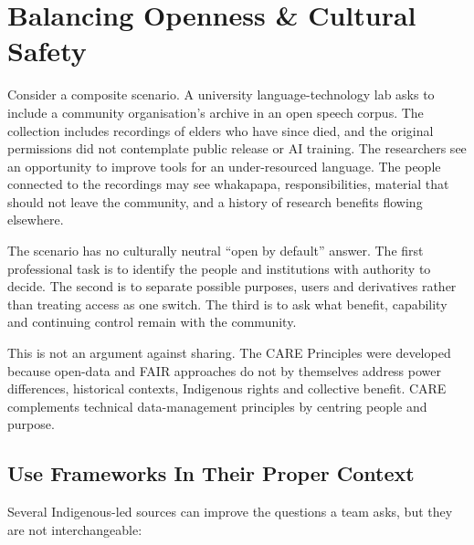 \section{Balancing Openness \& Cultural Safety}
Consider a composite scenario. A university language-technology lab asks to include a community organisation's archive in an open speech corpus. The collection includes recordings of elders who have since died, and the original permissions did not contemplate public release or AI training. The researchers see an opportunity to improve tools for an under-resourced language. The people connected to the recordings may see whakapapa, responsibilities, material that should not leave the community, and a history of research benefits flowing elsewhere.


The scenario has no culturally neutral ``open by default'' answer. The first professional task is to identify the people and institutions with authority to decide. The second is to separate possible purposes, users and derivatives rather than treating access as one switch. The third is to ask what benefit, capability and continuing control remain with the community.


This is not an argument against sharing. The CARE Principles were developed because open-data and FAIR approaches do not by themselves address power differences, historical contexts, Indigenous rights and collective benefit. CARE complements technical data-management principles by centring people and purpose. \autocite{care}



\subsection{Use Frameworks In Their Proper Context}


Several Indigenous-led sources can improve the questions a team asks, but they are not interchangeable:


